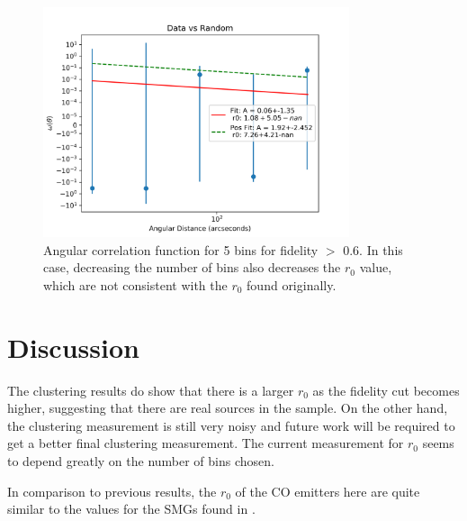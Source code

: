 \begin{figure}[!tbp]
\centering \includegraphics[width=90mm]{clustering_two/Data_vs_Random_10000_bin5_sn0_6_NFalse.png}
\caption{Angular correlation function for 5 bins for fidelity $>$ 0.6. In this case, decreasing the number of bins also decreases the $r_0$ value, which are not consistent with the $r_0$ found originally.}
\label{fig:Angular_bin_5}
\end{figure}

\section{Discussion}

The clustering results do show that there is a larger $r_0$ as the fidelity cut becomes higher, suggesting that there are real sources in the sample. On the other hand, the clustering measurement is still very noisy and future work will be required to get a better final clustering measurement. The current measurement for $r_0$ seems to depend greatly on the number of bins chosen. 

In comparison to previous results, the $r_0$ of the CO emitters here are quite similar to the values for the SMGs found in \cite{10.1111/j.1365-2966.2011.20303.x}.

